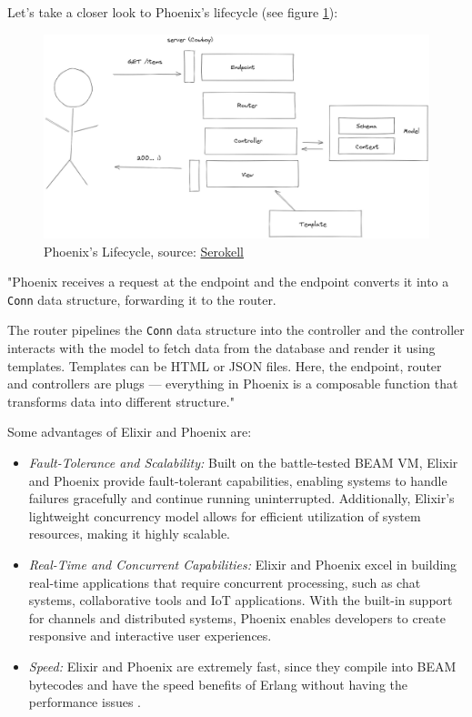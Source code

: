 Let's take a closer look to Phoenix's lifecycle (see figure \ref{fig:phx_lc}):\newline

\begin{figure}[htbp]
	\centering
	\includegraphics[scale=0.2]{figures/phx_lifecycle.png}  %
	\caption{Phoenix's Lifecycle, source: \href{https://serokell.io/blog/introduction-to-phoenix}{Serokell}}
	\label{fig:phx_lc}
\end{figure}

"Phoenix receives a request at the endpoint and the endpoint converts it into a \texttt{Conn} data structure, forwarding it to the router.\newline

The router pipelines the \texttt{Conn} data structure into the controller and the controller interacts with the model to fetch data from the database and render it using templates. Templates can be HTML or JSON files. Here, the endpoint, router and controllers are plugs — everything in Phoenix is a composable function that transforms data into different structure." \cite{phx}\newline


Some advantages of Elixir and Phoenix are:

\begin{itemize}
    \item \textit{Fault-Tolerance and Scalability:} Built on the battle-tested BEAM VM, Elixir and Phoenix provide fault-tolerant capabilities, enabling systems to handle failures gracefully and continue running uninterrupted. Additionally, Elixir's lightweight concurrency model allows for efficient utilization of system resources, making it highly scalable.
    \item \textit{Real-Time and Concurrent Capabilities:} Elixir and Phoenix excel in building real-time applications that require concurrent processing, such as chat systems, collaborative tools and IoT applications. With the built-in support for channels and distributed systems, Phoenix enables developers to create responsive and interactive user experiences.
    \item \textit{Speed:} Elixir and Phoenix are extremely fast, since they compile into BEAM bytecodes and have the speed benefits of Erlang without having the performance issues \cite{adv}.

\end{itemize}


